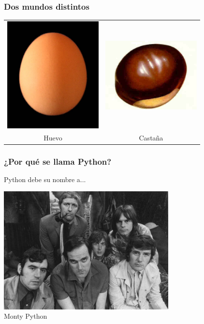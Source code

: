 \documentclass{beamer}
\begin{document}
\begin{frame}
  \frametitle{Dos mundos distintos}
  \begin{center}
    \begin{tabular}[h]{cc}
      \includegraphics[width=5cm]{files/huevo.jpg} &
      \includegraphics[width=5cm]{files/castana.jpg}\\
      Huevo & Castaña
    \end{tabular}
  \end{center}
\end{frame}


\begin{frame}
  \frametitle{¿Por qué se llama Python?}
  Python debe su nombre a...
\end{frame}

\begin{frame}
  \begin{center}
    \includegraphics[width=9cm]{files/python.jpg}\\
    Monty Python
  \end{center}

\end{frame}
\end{document}
